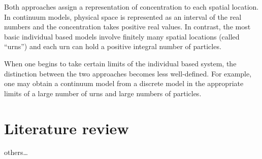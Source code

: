 Both approaches assign a representation of concentration to each
spatial location. In continuum models, physical space is represented as an
interval of the real numbers and the concentration takes positive real values.
In contrast, the most basic individual based models involve finitely many
spatial locations (called ``urns'') and each urn can hold a positive integral
number of particles.

When one begins to take certain limits of the individual based system, the
distinction between the two approaches becomes less well-defined. For example,
one may obtain a continuum model from a discrete model in the appropriate limits
of a large number of urns and large numbers of particles. 

\section{Literature review}
\cite{chernyavsky2011transport} \cite{chernyavsky2012characterizing}
others\ldots

